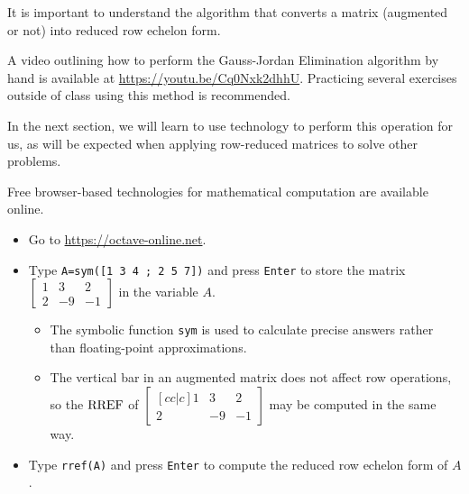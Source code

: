 \begin{remark}
It is important to understand the  algorithm
that converts a matrix (augmented or not) into reduced row echelon form.

\vspace{1em}

A video outlining how to perform the Gauss-Jordan Elimination algorithm
by hand is available at \url{https://youtu.be/Cq0Nxk2dhhU}.
Practicing several exercises outside of class using this method is
recommended.

\vspace{1em}

In the next section, we will learn to use technology to perform this
operation for us, as will be expected when applying row-reduced
matrices to solve other problems.
\end{remark}





\begin{activity}{10}
Free browser-based technologies for mathematical computation
are available online.
\begin{itemize}
\item Go to \url{https://octave-online.net}.
\item Type \texttt{A=sym([1 3 4 ; 2 5 7])} and press \texttt{Enter}
      to store the matrix
      \(\begin{bmatrix} 1 & 3 & 2 \\ 2 & -9 & -1 \end{bmatrix}\)
      in the variable \(A\).
  \begin{itemize}
    \item The symbolic function \texttt{sym} is used to calculate precise answers 
          rather than floating-point approximations.
    \item The vertical bar in an augmented matrix does not affect
          row operations, so the \(\operatorname{RREF}\) of
      \(\begin{bmatrix}[cc|c] 1 & 3 & 2 \\ 2 & -9 & -1 \end{bmatrix}\)
          may be computed in the same way.
  \end{itemize}
\item Type \texttt{rref(A)} and press \texttt{Enter}
      to compute the reduced row echelon form of \(A\).
\end{itemize}
\end{activity}

